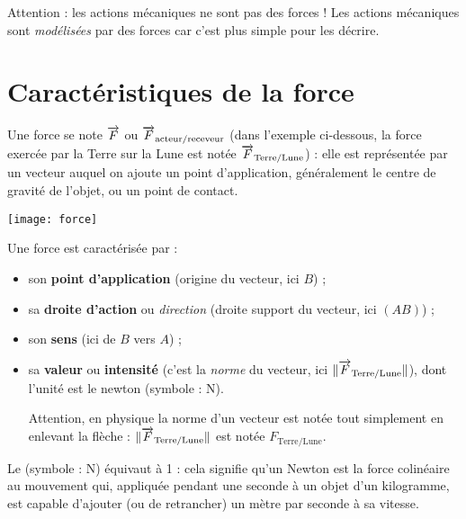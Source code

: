 Attention : les actions mécaniques ne sont pas des forces ! Les actions mécaniques sont \emph{modélisées} par des forces car c'est plus simple pour les décrire.




\section{Caractéristiques de la force}

Une force se note $\overrightarrow{F}$ ou $\overrightarrow{F}_\text{acteur/receveur}$ (dans l'exemple ci-dessous, la force exercée par la Terre sur la Lune est notée $\overrightarrow{F}_\text{Terre/Lune}$) : elle est représentée par un vecteur auquel on ajoute un point d'application, généralement le centre de gravité de l'objet, ou un point de contact.


\begin{center}
    \texttt{[image: force]}
\end{center}

\vspace{1em}

\begin{aconnaitre}
Une force est caractérisée par :
\begin{itemize}
\item son \textbf{point d'application} (origine du vecteur, ici $B$) ;
\item sa \textbf{droite d'action} ou \emph{direction} (droite support du vecteur, ici $(AB)$) ;
\item son \textbf{sens} (ici de $B$ vers $A$) ;
\item sa \textbf{valeur} ou \textbf{intensité} (c'est la \emph{norme} du vecteur, ici $\lVert\overrightarrow{F}_\text{Terre/Lune}\rVert$), dont l'unité est le newton (symbole : N).

Attention, en physique la norme d'un vecteur est notée tout simplement en enlevant la flèche : $\lVert\overrightarrow{F}_\text{Terre/Lune}\rVert$ est notée $F_\text{Terre/Lune}$.
\end{itemize}
\end{aconnaitre}

\vspace{1em}


Le \textbf{} (symbole : N) équivaut à 1 : cela signifie qu'un Newton est la force colinéaire au mouvement qui, appliquée pendant une seconde à un objet d'un kilogramme, est capable d'ajouter (ou de retrancher) un mètre par seconde à sa vitesse.

